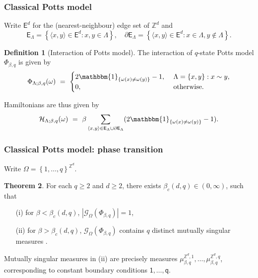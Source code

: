 \documentclass{beamer}
\newcommand{\E}{\mathsf{E}}
\newcommand{\G}{\mathcal{G}}
\renewcommand{\H}{\mathcal{H}}
\newcommand{\Z}{\mathbb{Z}}
\newcommand{\set}[1]{\left\{#1\right\}}
\newcommand{\1}{\mathbbm{1}}
\renewcommand{\sp}[1]{\langle #1\rangle}
\newcommand{\5}{\vspace{0.5cm}}
\newcommand{\3}{\vspace{0.3cm}}
\theoremstyle{definition}
\newtheorem{thm}{Theorem}[section]
\newtheorem{df}[thm]{Definition}
\begin{document}

\begin{frame}
\frametitle{Classical Potts model}
Write $\E^d$ for the (nearest-neighbour) edge set of $\Z^d$ and
$$\E_\Lambda=\set{\sp{x,y}\in\E^d:x,y\in\Lambda}, \quad \partial\E_\Lambda=\set{\sp{x,y}\in\E^d:x\in\Lambda,y\notin\Lambda}.$$\pause
\begin{df}[Interaction of Potts model]
The interaction of $q$-state Potts model $\Phi_{\beta,q}$ is given by
$$\Phi_{\Lambda;\beta,q}(\omega) ~=~ \begin{cases}
2\1_{\set{\omega(x)\neq\omega(y)}}-1, ~& \Lambda=\set{x,y}:x\sim y, \\
0, ~&\text{otherwise}.
\end{cases}$$
\end{df}\pause
Hamiltonians are thus given by
$$\H_{\Lambda;\beta,q}(\omega) ~=~ \beta\sum_{\sp{x,y}\in\E_\Lambda\cup\partial\E_\Lambda}(2\1_{\set{\omega(x)\neq\omega(y)}}-1).$$
\end{frame}

\begin{frame}
\frametitle{Classical Potts model: phase transition}
Write $\Omega=\set{1,\ldots,q}^{\Z^d}$.\vspace{0.3cm}
\begin{thm}
For each $q\geq 2$ and $d\geq 2$, there exists $\beta_c(d,q)\in(0,\infty)$, such that \pause
\begin{itemize}
	\item[(i)] for $\beta<\beta_c(d,q)$, $|\G_{\Omega}(\Phi_{\beta,q})|=1$,\pause
	\item[(ii)] for $\beta>\beta_c(d,q)$, $\G_{\Omega}(\Phi_{\beta,q})$ contains $q$ distinct mutually singular measures .
\end{itemize}
\end{thm}\pause\vspace{0.3cm}
Mutually singular measures in (ii) are precisely measures $\mu_{\beta,q}^{\Z^d,1},\ldots,\mu_{\beta,q}^{\Z^d,q}$, corresponding to constant boundary conditions $\mathsf{1},\ldots,\mathsf{q}$.
\end{frame}

\end{document}
